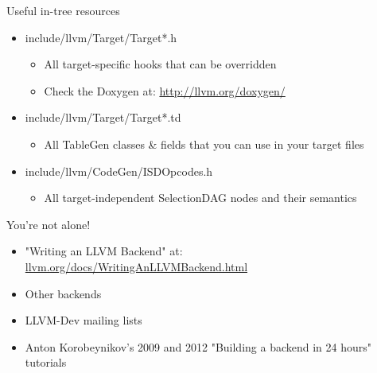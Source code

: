 
\begin{frame}{Useful in-tree resources}

\begin{itemize}
    \item include/llvm/Target/Target*.h
    \begin{itemize}
        \item All target-specific hooks that can be overridden
        \item Check the Doxygen at: \url{http://llvm.org/doxygen/}
    \end{itemize}
    \item include/llvm/Target/Target*.td
    \begin{itemize}
        \item All TableGen classes \& fields that you can use in your target files
    \end{itemize}
    \item include/llvm/CodeGen/ISDOpcodes.h
    \begin{itemize}
        \item All target-independent SelectionDAG nodes and their semantics
    \end{itemize}
\end{itemize}

\end{frame}


\begin{frame}{You're not alone!}

\begin{itemize}
    \item "Writing an LLVM Backend" at: \url{llvm.org/docs/WritingAnLLVMBackend.html}
    \item Other backends 
    \item LLVM-Dev mailing lists
    \item Anton Korobeynikov's 2009 and 2012 "Building a backend in 24 hours" tutorials
\end{itemize}

\end{frame}
